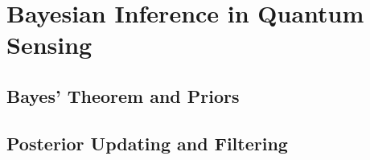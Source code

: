 \chapter{Bayesian Inference in Quantum Sensing}
\section{Bayes' Theorem and Priors}
\section{Posterior Updating and Filtering}
